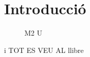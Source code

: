 \section*{Introducció}

\lipsum[9]


\begin{figure}[h!]
\centering\RubikCubeSolvedWY
{}
\caption{M2 U}
\label{solved}
\end{figure}

i TOT ES VEU AL llibre \cite{ross_rubiks}
